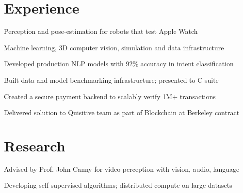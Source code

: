 \documentclass[]{deedy-resume-openfont}
\begin{document}
\hfill
\begin{minipage}[t]{0.66\textwidth} 


\section{Experience}
\vspace{\topsep} %
\begin{tightemize}
\item Perception and pose-estimation for robots that test Apple Watch
\item Machine learning, 3D computer vision, simulation and data infrastructure
\end{tightemize}
\sectionsep

\begin{tightemize}
\item Developed production NLP models with 92\% accuracy in intent classification
\item Built data and model benchmarking infrastructure; presented to C-suite
\end{tightemize}
\sectionsep

\begin{tightemize}
\item Created a secure payment backend to scalably verify 1M+ transactions
\item Delivered solution to Quisitive team as part of  Blockchain at Berkeley contract

\end{tightemize}
\sectionsep


\section{Research}
\begin{tightemize}
\item Advised by Prof. John Canny for video perception with vision, audio, language
\item Developing self-supervised algorithms; distributed compute on large datasets
\end{tightemize}
\sectionsep



\end{minipage}
\end{document}
